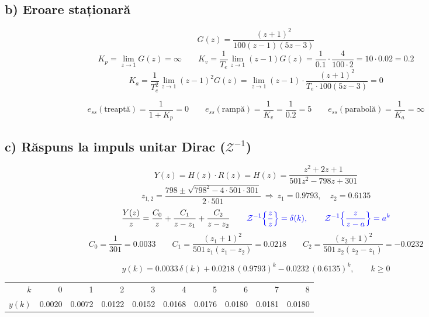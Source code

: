 \documentclass[10pt,a4paper]{article}
\begin{document}
\subsection*{b) Eroare staționară}
$$G(z)=\frac{(z+1)^2}{100(z-1)(5z-3)}$$
$$K_p=\lim_{z\to1}G(z)=\infty\qquad
K_v=\frac1{T_e}\lim_{z\to1}(z-1)G(z)=\frac1{0.1}\cdot\frac{4}{100\cdot2}=10\cdot0.02=0.2$$
$$K_a=\frac1{T_e^2}\lim_{z\to1}(z-1)^2G(z)=\lim_{z\to1}(z-1)\cdot\frac{(z+1)^2}{T_e\cdot100(5z-3)}=0$$
\begin{res}
$$e_{ss}(\text{treaptă})=\frac1{1+K_p}=0\qquad
e_{ss}(\text{rampă})=\frac1{K_v}=\frac1{0.2}=5\qquad
e_{ss}(\text{parabolă})=\frac1{K_a}=\infty$$
\end{res}

\subsection*{c) Răspuns la impuls unitar Dirac ($\mathcal Z^{-1}$)}
$$Y(z)=H(z)\cdot R(z)=H(z)=\frac{z^2+2z+1}{501z^2-798z+301}$$
$$z_{1,2}=\frac{798\pm\sqrt{798^2-4\cdot501\cdot301}}{2\cdot501}\ \Rightarrow\ z_1=0.9793,\quad z_2=0.6135$$
$$\frac{Y(z)}z=\frac{C_0}z+\frac{C_1}{z-z_1}+\frac{C_2}{z-z_2}\qquad
\textcolor{blue}{\mathcal Z^{-1}\Big\{\frac zz\Big\}=\delta(k),\qquad \mathcal Z^{-1}\Big\{\frac{z}{z-a}\Big\}=a^k}$$
$$C_0=\frac1{301}=0.0033\qquad C_1=\frac{(z_1+1)^2}{501\,z_1(z_1-z_2)}=0.0218\qquad C_2=\frac{(z_2+1)^2}{501\,z_2(z_2-z_1)}=-0.0232$$
\begin{res}
$$y(k)=0.0033\,\delta(k)+0.0218\,(0.9793)^k-0.0232\,(0.6135)^k,\qquad k\ge0$$
\end{res}
\begin{center}
\begin{tabular}{@{}rrrrrrrrrr@{}}
$k$&0&1&2&3&4&5&6&7&8\\
$y(k)$&0.0020&0.0072&0.0122&0.0152&0.0168&0.0176&0.0180&0.0181&0.0180\\
\end{tabular}
\end{center}

\begin{center}
\end{center}
\end{document}
